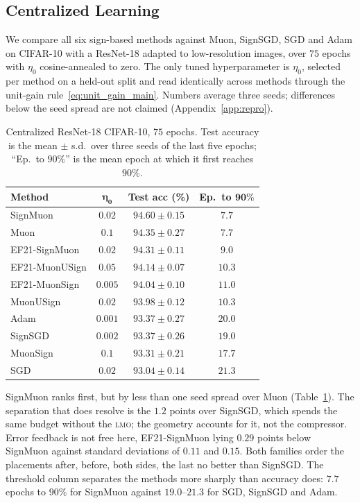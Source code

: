 \subsection{Centralized Learning}
We compare all six sign-based methods against Muon, SignSGD, SGD and Adam on CIFAR-10 \cite{krizhevsky2009cifar} with a ResNet-18 adapted to low-resolution images, over $75$ epochs with $\eta_0$ cosine-annealed to zero. The only tuned hyperparameter is $\eta_0$, selected per method on a held-out split and read identically across methods through the unit-gain rule~\eqref{eq:unit_gain_main}. Numbers average three seeds; differences below the seed spread are not claimed (Appendix~\ref{app:repro}).

\begin{table}[!tb]
\centering
\small
\renewcommand{\arraystretch}{1.15}
\begin{tabular}{@{}lccc@{}}
\toprule
\textbf{Method} & $\boldsymbol{\eta_0}$ & \textbf{Test acc (\%)} & \textbf{Ep.\ to $\mathbf{90\%}$} \\
\midrule
SignMuon & $0.02$ & $94.60 \pm 0.15$ & $7.7$ \\
Muon & $0.1$ & $94.35 \pm 0.27$ & $7.7$ \\
EF21-SignMuon & $0.02$ & $94.31 \pm 0.11$ & $9.0$ \\
EF21-MuonUSign & $0.05$ & $94.14 \pm 0.07$ & $10.3$ \\
EF21-MuonSign & $0.005$ & $94.04 \pm 0.10$ & $11.0$ \\
MuonUSign & $0.02$ & $93.98 \pm 0.12$ & $10.3$ \\
Adam & $0.001$ & $93.37 \pm 0.27$ & $20.0$ \\
SignSGD & $0.002$ & $93.37 \pm 0.26$ & $19.0$ \\
MuonSign & $0.1$ & $93.31 \pm 0.21$ & $17.7$ \\
SGD & $0.02$ & $93.04 \pm 0.14$ & $21.3$ \\
\bottomrule
\end{tabular}
\caption{Centralized  ResNet-18  CIFAR-10, $75$ epochs. Test accuracy is the mean $\pm$ s.d.\ over three seeds of the last five epochs; ``Ep.\ to $90\%$'' is the mean epoch at which it first reaches $90\%$.}
\label{tab:cifar_main}
\end{table}

SignMuon ranks first, but by less than one seed spread over Muon (Table~\ref{tab:cifar_main}). The separation that does resolve is the $1.2$ points over SignSGD, which spends the same budget without the \textsc{lmo}; the geometry accounts for it, not the compressor. Error feedback is not free here, EF21-SignMuon lying $0.29$ points below SignMuon against standard deviations of $0.11$ and $0.15$. Both families order the placements after, before, both sides, the last no better than SignSGD. The threshold column separates the methods more sharply than accuracy does: $7.7$ epochs to $90\%$ for SignMuon against $19.0$--$21.3$ for SGD, SignSGD and Adam.

